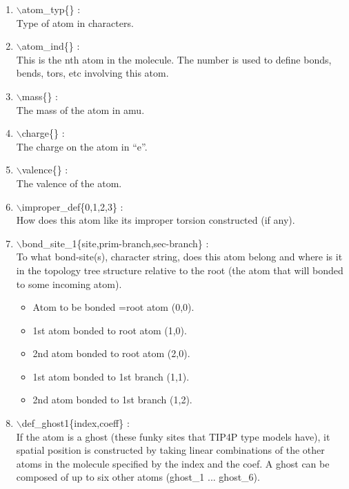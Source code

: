\documentclass[12pt,titlepage]{article}
\begin{document}
\begin{enumerate}

 \vspace{0.15in} 
 \item  $\backslash$atom\_typ\{\} : \\ 
   Type of atom in characters.
 
 \vspace{0.15in} 
 \item  $\backslash$atom\_ind\{\} : \\ 
   This is the nth atom in the molecule. The number is used to 
   define bonds, bends, tors, etc involving this atom.

 \vspace{0.15in} 
 \item  $\backslash$mass\{\} : \\ 
    The mass of the atom in amu.

 \vspace{0.15in} 
 \item  $\backslash$charge\{\} : \\ 
    The charge on the atom in ``e''.

 \vspace{0.15in} 
 \item  $\backslash$valence\{\} : \\ 
    The valence of the atom.

 \vspace{0.15in} 
 \item  $\backslash$improper\_def\{0,1,2,3\} : \\ 
    How does this atom like its improper torsion constructed (if any).

 \vspace{0.15in} 
 \item  $\backslash$bond\_site\_1\{site,prim-branch,sec-branch\} : \\ 
    To what bond-site(s), character string, does this atom belong and where is
    it in the topology tree structure relative to the root (the atom
    that will bonded to some incoming atom).
      \begin{itemize}
        \item Atom to be bonded =root atom  (0,0).
        \item 1st atom bonded to root atom  (1,0).
        \item 2nd atom bonded to root atom  (2,0).
        \item 1st atom bonded to 1st branch (1,1).
        \item 2nd atom bonded to 1st branch (1,2).
      \end{itemize}


 \vspace{0.15in} 
 \item  $\backslash$def\_ghost1\{index,coeff\} : \\ 
    If the atom is a ghost (these funky sites that TIP4P type
    models have), it spatial position is constructed by taking linear 
    combinations of the other atoms in the molecule specified by the index 
    and the coef. A ghost can be composed of up to six other atoms
    (ghost\_1{} ... ghost\_6{}).

\end{enumerate}
\end{document}
